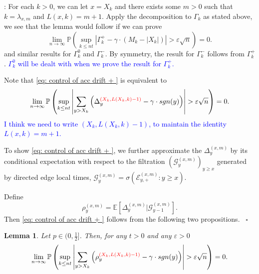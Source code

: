 \documentclass[twoside,12pt,a4paper]{article}
\newtheorem{lemma}{Lemma}[section]
\numberwithin{equation}{section}
\newenvironment{proof}[1][Proof]{{\sc #1}:}{~\hfill $\square$}
\newcommand{\abs}[1]{\left\vert #1 \right\vert}
\newcommand{\edt}[1]{\textcolor{red}{#1}} %
\newcommand{\comment}[1]{\textcolor{blue}{#1}}
\begin{document}
	\begin{proof}[Proof of Lemma \ref{lm: control of acc drift}]
		For each $k > 0$, we can let $x = X_k$ and there exists some $m>0$ such that $k = \lambda_{x,m}$ and $L(x,k) = m+1$. Apply the decomposition to $\Gamma_k$ as stated above, we see that
		the lemma would follow if we can prove
		\begin{equation}\label{eq: control of acc drift + }
			\lim_{n \to \infty }\mathbb{P}\left(\sup_{k\leq nt} \abs{\Gamma^+_k - \gamma \cdot \left(M_k - \abs{X_k} \right)   } > \varepsilon \sqrt{n}  \right) =0. 
		\end{equation}
		and similar results for $\Gamma_k^0$ and $\Gamma_k^-$. By symmetry, the result for $\Gamma_k^-$ follows from $\Gamma_k^+$. 
		\comment{$\Gamma_k^0$ will be dealt with when we prove the result for $\Gamma_k^+$.}
		
		Note that \eqref{eq: control of acc drift + } is equivalent to
		\begin{equation}
			\lim_{n \to \infty }\mathbb{P}\left(\sup_{k\leq nt} \abs{\sum_{y> X_k} \left( \Delta_{y}^{\edt{(X_k,L(X_k,k) - 1)}} - \gamma  \cdot sgn(y) \right)   }  > \varepsilon \sqrt{n}  \right) =0. 
		\end{equation}
		\comment{I think we need to write $(X_k,L(X_k,k) - 1)$, to maintain the identity  $L(x,k) = m + 1$.}
		
		To show \eqref{eq: control of acc drift + }, we further approximate the $\Delta_{y}^{(x,m)}$ by its conditional expectation with respect to the filtration $\left(\mathcal{G}_{y}^{(x,m)}\right)_{y\geq x}$ generated by directed edge local times, $ \mathcal{G}_{y}^{(x,m)} = \sigma\left( \mathcal{E}^{(x,m)}_{y,+} : y \geq x \right)$.
		
		Define
		\begin{equation}\label{eq: conditional mean}
			\rho_{y}^{(x,m)}= \mathbb{E}\left[\Delta_y^{(x,m)} | \mathcal{G}_{y-1}^{(x,m)}\right].
		\end{equation}
		Then \eqref{eq: control of acc drift + } follows from the following two propositions.
	\end{proof}
	\begin{lemma}\label{lm: approximation of means of local drift}
		Let $p\in (0,\frac{1}{2}]$. Then, for any $t>0$ and any $\varepsilon >0$
		\begin{equation}\label{eq: control of expected local drift}
			\lim_{n \to \infty }\mathbb{P}\left(\sup_{k\leq nt} \abs{\sum_{y> X_k} \left( \rho_{y}^{\edt{(X_k,L(X_k,k)-1)}} - \gamma  \cdot sgn(y) \right)   }  > \varepsilon \sqrt{n}  \right) =0. 
		\end{equation}
	\end{lemma}
	
\end{document}
